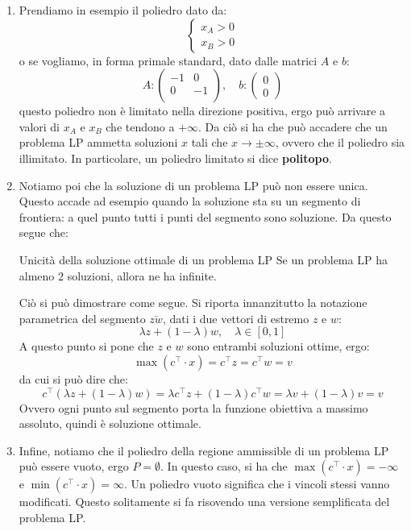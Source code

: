 \documentclass[a4paper,11pt]{article}
\begin{document}
\begin{enumerate}
	\item 
		Prendiamo in esempio il poliedro dato da:
		\[
			\begin{cases}
				x_A > 0 \\ 
				x_B > 0
			\end{cases}
		\]
		o se vogliamo, in forma primale standard, dato dalle matrici $A$ e $b$:
		$$
		A:
		\begin{pmatrix}
			-1 & 0 \\	
			0 & -1 \\	
		\end{pmatrix}
		, \quad b:
		\begin{pmatrix}
			0 \\ 
			0
		\end{pmatrix}
		$$
		questo poliedro non è limitato nella direzione positiva, ergo può arrivare a valori di $x_A$ e $x_B$ che tendono a $+\infty$.
		Da ciò si ha che può accadere che un problema LP ammetta soluzioni $x$ tali che $x \rightarrow \pm \infty $,
		ovvero che il poliedro sia illimitato.
		In particolare, un poliedro limitato si dice \textbf{politopo}.
	\item Notiamo poi che la soluzione di un problema LP può non essere unica.
		Questo accade ad esempio quando la soluzione sta su un segmento di frontiera: a quel punto tutti i punti del segmento sono soluzione.
		Da questo segue che:
		\begin{theorem}{Unicità della soluzione ottimale di un problema LP}
			Se un problema LP ha almeno 2 soluzioni, allora ne ha infinite.
		\end{theorem}
		Ciò si può dimostrare come segue.
		Si riporta innanzitutto la notazione parametrica del segmento $\bar{zw}$, dati i due vettori di estremo $z$ e $w$:
		$$
			\lambda z + (1 - \lambda)w, \quad \lambda \in [ 0, 1 ]
		$$
		A questo punto si pone che $z$ e $w$ sono entrambi soluzioni ottime, ergo: 
		$$ 
			\max(c^\intercal \cdot x) = c^\intercal z = c^\intercal w = v 
		$$
		da cui si può dire che:
		$$ 
			c^\intercal\left(\lambda z + (1 - \lambda)w\right) = \lambda c^\intercal z + (1 - \lambda) c^\intercal w = \lambda v + (1 - \lambda) v = v 
		$$
		Ovvero ogni punto sul segmento porta la funzione obiettiva a massimo assoluto, quindi è soluzione ottimale.
	\item Infine, notiamo che il poliedro della regione ammissible di un problema LP può essere vuoto, ergo $P = \emptyset$.
		In questo caso, si ha che $ \max(c^\intercal \cdot x) = -\infty $ e $ \min(c^\intercal \cdot x) = \infty $. 
		Un poliedro vuoto significa che i vincoli stessi vanno modificati. 
		Questo solitamente si fa risovendo una versione semplificata del problema LP.
\end{enumerate}
\end{document}
